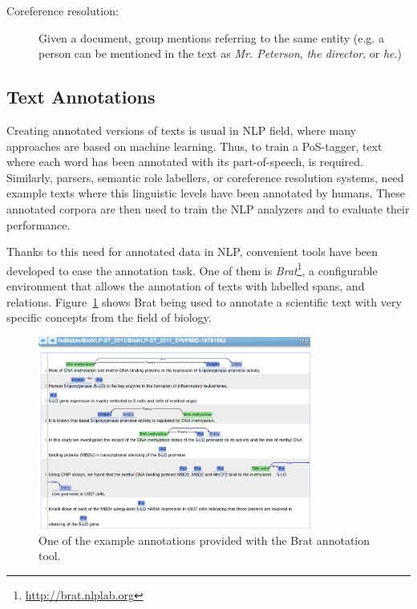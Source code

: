\begin{description}
\item[Coreference resolution:] Given a document, group mentions referring to the same entity (e.g. a person can be mentioned in the text as \textit{Mr. Peterson}, \textit{the director}, or \textit{he}.) 
\end{description}

\subsection{Text Annotations}

Creating annotated versions of texts is usual in NLP field, where many
approaches are based on machine learning. Thus, to train a PoS-tagger, text
where each word has been annotated with its part-of-speech, is required.
Similarly, parsers, semantic role labellers, or coreference resolution systems,
need example texts where this linguistic levels have been annotated by humans.
These annotated corpora are then used to train the NLP analyzers and to
evaluate their performance.

Thanks to this need for annotated data in NLP, convenient tools have been
developed to ease the annotation task. One of them is
\emph{Brat}\footnote{\url{http://brat.nlplab.org}}, a configurable environment that
allows the annotation of texts with labelled spans, and relations.
Figure~\ref{fig:brat} shows Brat being used to annotate a scientific text with
very specific concepts from the field of biology.

\begin{figure}[htb]
  \centering
  \includegraphics[width=0.8\textwidth]{figures/brat}
  \caption{One of the example annotations provided with the Brat
    annotation tool.}
  \label{fig:brat}
\end{figure}

